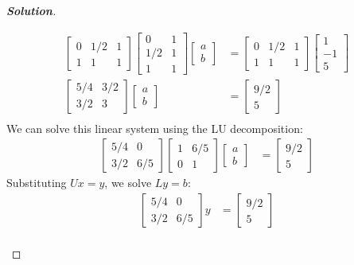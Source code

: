 \documentclass[11pt]{article}
\newenvironment{solution}{%
  \begin{proof}[\textbf{Solution}]$ $\par\nobreak\ignorespaces
}{%
  \end{proof}
}
\theoremstyle{definition}
\begin{document}
\begin{solution}
\begin{enumerate}[(a)]
\begin{align*}
    \begin{bmatrix*}0 & 1/2 & 1 \\ 1 & 1 & 1\end{bmatrix*}\begin{bmatrix*}0 & 1 \\ 1/2 & 1 \\ 1 & 1\end{bmatrix*}\begin{bmatrix*}a \\ b\end{bmatrix*} &= \begin{bmatrix*}0 & 1/2 & 1 \\ 1 & 1 & 1\end{bmatrix*} \begin{bmatrix*}1 \\ - 1 \\ 5\end{bmatrix*} \\
    \begin{bmatrix*}5/4 & 3/2 \\ 3/2 & 3\end{bmatrix*} \begin{bmatrix*}a \\ b\end{bmatrix*} &= \begin{bmatrix*} 9/2 \\ 5 \end{bmatrix*} \\
\end{align*}
We can solve this linear system using the LU decomposition:
\begin{align*}
    \begin{bmatrix*}5/4 & 0 \\ 3/2 &  6/5\end{bmatrix*}\begin{bmatrix*}1 & 6/5 \\ 0 & 1\end{bmatrix*}\begin{bmatrix*}a \\ b\end{bmatrix*} &= \begin{bmatrix*} 9/2 \\ 5 \end{bmatrix*}
\end{align*}
Substituting $Ux = y$, we solve $Ly = b$:
\begin{align*}
    \begin{bmatrix*}5/4 & 0 \\ 3/2 &  6/5\end{bmatrix*}y &= \begin{bmatrix*} 9/2 \\ 5 \end{bmatrix*} \\

\end{align*}
\end{enumerate}
\end{solution}
\end{document}
